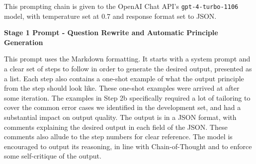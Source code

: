 \documentclass[11pt]{article}
\begin{document}
This prompting chain is given to the OpenAI Chat API's \lstinline{gpt-4-turbo-1106} model, with temperature set at 0.7 and response format set to JSON.

\textbf{Stage 1 Prompt - Question Rewrite and Automatic Principle Generation} \label{sec:principle-adherence-stage1}

This prompt uses the Markdown formatting. It starts with a system prompt and a clear set of steps to follow in order to generate the desired output, presented as a list. Each step also contains a one-shot example of what the output principle from the step should look like. These one-shot examples were arrived at after some iteration. The examples in Step 2b specifically required a lot of tailoring to cover the common error cases we identified in the development set, and had a substantial impact on output quality. The output is in a JSON format, with comments explaining the desired output in each field of the JSON. These comments also allude to the step numbers for clear reference. The model is encouraged to output its reasoning, in line with Chain-of-Thought and to enforce some self-critique of the output. 
\end{document}
